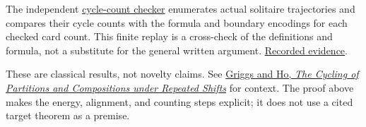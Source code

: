 \documentclass[11pt,a4paper]{article}
\begin{document}
The independent \href{https://github.com/mpelteshki/climbing-to-the-frontier/blob/212bba53b1818c08c40b8c4b48f636651eaf6410/cagent/p3/c1/check_cycles.py}{cycle-count checker} enumerates actual solitaire trajectories and compares their cycle counts with the formula and boundary encodings for each checked card count. This finite replay is a cross-check of the definitions and formula, not a substitute for the general written argument. \href{https://github.com/mpelteshki/climbing-to-the-frontier/blob/212bba53b1818c08c40b8c4b48f636651eaf6410/cagent/p3/evidence/cycle-counts.json}{Recorded evidence}.

These are classical results, not novelty claims. See \href{https://sc.edu/study/colleges_schools/artsandsciences/mathematics/research/imi/research/documents/1998/1998_12.pdf}{Griggs and Ho, \emph{The Cycling of Partitions and Compositions under Repeated Shifts}} for context. The proof above makes the energy, alignment, and counting steps explicit; it does not use a cited target theorem as a premise.
\end{document}
